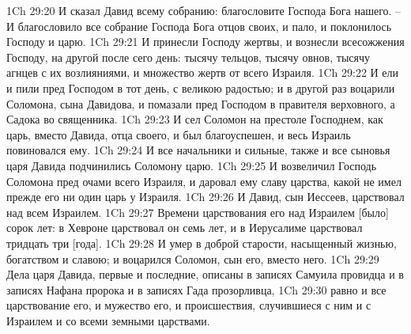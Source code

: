 1Ch 29:20  И сказал Давид всему собранию: благословите Господа Бога нашего. --И благословило все собрание Господа Бога отцов своих, и пало, и поклонилось Господу и царю.
1Ch 29:21  И принесли Господу жертвы, и вознесли всесожжения Господу, на другой после сего день: тысячу тельцов, тысячу овнов, тысячу агнцев с их возлияниями, и множество жертв от всего Израиля.
1Ch 29:22  И ели и пили пред Господом в тот день, с великою радостью; и в другой раз воцарили Соломона, сына Давидова, и помазали пред Господом в правителя верховного, а Садока во священника.
1Ch 29:23  И сел Соломон на престоле Господнем, как царь, вместо Давида, отца своего, и был благоуспешен, и весь Израиль повиновался ему.
1Ch 29:24  И все начальники и сильные, также и все сыновья царя Давида подчинились Соломону царю.
1Ch 29:25  И возвеличил Господь Соломона пред очами всего Израиля, и даровал ему славу царства, какой не имел прежде его ни один царь у Израиля.
1Ch 29:26  И Давид, сын Иессеев, царствовал над всем Израилем.
1Ch 29:27  Времени царствования его над Израилем [было] сорок лет: в Хевроне царствовал он семь лет, и в Иерусалиме царствовал тридцать три [года].
1Ch 29:28  И умер в доброй старости, насыщенный жизнью, богатством и славою; и воцарился Соломон, сын его, вместо него.
1Ch 29:29  Дела царя Давида, первые и последние, описаны в записях Самуила провидца и в записях Нафана пророка и в записях Гада прозорливца,
1Ch 29:30  равно и все царствование его, и мужество его, и происшествия, случившиеся с ним и с Израилем и со всеми земными царствами.


